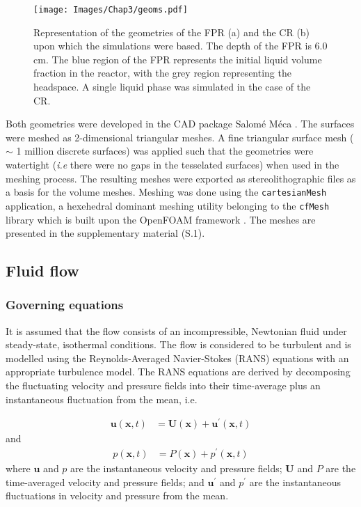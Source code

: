  \begin{figure}[H]
\centering
\texttt{[image: Images/Chap3/geoms.pdf]}
\caption{Representation of the geometries of the FPR (a) and the CR (b) upon which the simulations were based. The depth of the FPR is 6.0 cm. The blue region of the FPR represents the initial liquid volume fraction in the reactor, with the grey region representing the headspace. A single liquid phase was simulated in the case of the CR.}
\label{fig:geoms}
\end{figure}

Both geometries were developed in the CAD package Salom\'{e} M\'{e}ca \cite{salome}. The surfaces were meshed as 2-dimensional triangular meshes. A fine triangular surface mesh ($\mathtt{\sim}$ 1 million discrete surfaces) was applied such that the geometries were watertight (\emph{i.e} there were no gaps in the tesselated surfaces) when used in the meshing process. The resulting meshes were exported as stereolithographic files as a basis for the volume meshes. Meshing was done using the \texttt{cartesianMesh} application, a hexehedral dominant meshing utility belonging to the \texttt{cfMesh} library \cite{cfmesh} which is built upon the OpenFOAM framework \cite{of50}. The meshes are presented in the supplementary material (S.1).

\subsection{Fluid flow}
\label{ssec:flow}

\subsubsection{Governing equations}

It is assumed that the flow consists of an incompressible, Newtonian fluid under steady-state, isothermal conditions. The flow is considered to be turbulent and is modelled using the Reynolds-Averaged Navier-Stokes (RANS) equations with an appropriate turbulence model. The RANS equations are derived by decomposing the fluctuating velocity and pressure fields into their time-average plus an instantaneous fluctuation from the mean, i.e.

\begin{align}
\mathbf{u}(\mathbf{x}, t) &= \mathbf{U}(\mathbf{x}) + \mathbf{u}^\prime(\mathbf{x}, t)
\end{align}
%
and 
%
\begin{align}
p(\mathbf{x}, t) &= P(\mathbf{x}) + p^\prime(\mathbf{x}, t)
\end{align}
%
where $\mathbf{u}$ and $p$ are the instantaneous velocity and pressure fields; $\mathbf{U}$ and $P$ are the time-averaged velocity and pressure fields; and $\mathbf{u}^\prime$ and $p^\prime$ are the instantaneous fluctuations in velocity and pressure from the mean.

